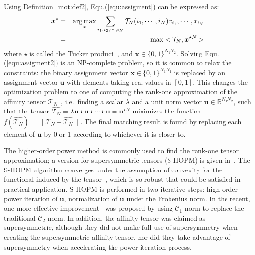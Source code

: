 Using Definition~\ref{mot:def2}, Equ.(\ref{equ:assigment}) can be expressed as:
\begin{eqnarray}
\label{equ:assigment2}
{\boldsymbol{x}}^* &=& \operatorname*{arg\,max}_{\boldsymbol{x}} \sum_{i_1,i_2,\cdots,i_N} \mathcal{T}_N(i_1,\cdots,i_N) x_{i_1},\cdots,x_{i_N} \nonumber\\
&=& \max <\mathcal{T}_N, \boldsymbol{x}^{\star N}>
\end{eqnarray}
where $\star$ is called the Tucker product~\cite{Kofidis02}, and $\boldsymbol{x} \in \{0,1\}^{N_1N_2}$.
Solving Equ.(\ref{equ:assigment2}) is an NP-complete problem,
so it is common to relax the constraints:
the binary assignment vector $\boldsymbol{x}\in \{0,1\}^{N_1N_2}$ is replaced by an assignment vector $\boldsymbol{u}$ with elements taking real values in $[0,1]$.
This changes the optimization problem to one of computing the rank-one approximation of the affinity tensor $\mathcal{T}_N$~\cite{Kofidis02},
i.e.\ finding a scalar $\lambda$ and a unit norm vector $\boldsymbol{u}\in \mathbb{R}^{N_1N_2}$,
such that the tensor $\hat{\mathcal{T}_N} = \lambda \boldsymbol{u}\star \boldsymbol{u} \star\cdots \star \boldsymbol{u}=\boldsymbol{u}^{\star N}$ minimizes the function $f(\hat{\mathcal{T}_N})=\lVert \mathcal{T}_N-\hat{\mathcal{T}_N} \lVert$.
The final matching result is found by replacing each element of $\boldsymbol{u}$ by 0 or 1 according to whichever it is closer to.

The higher-order power method is commonly used to find the rank-one tensor approximation;
a version for supersymmetric tensors (S-HOPM) is given in~\cite{Kofidis02}.
The S-HOPM algorithm converges under the assumption of convexity for the functional induced by the tensor~\cite{Kofidis02},
which is so robust that could be satisfied in practical application.
S-HOPM is performed in two iterative steps: high-order power iteration of $\boldsymbol{u}$, normalization of $\boldsymbol{u}$ under the Frobenius norm.
In the recent, one more effective improvement~\cite{Duchenne_etal09} was proposed by using $\mathcal{C}_1$ norm to replace the traditional $\mathcal{C}_2$ norm. 
In addition, the affinity tensor was claimed as supersymmetric, although they did not make full use of supersymmetry when creating the supersymmetric affinity tensor, 
nor did they take advantage of supersymmetry when accelerating the power iteration process.

